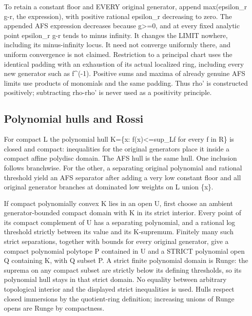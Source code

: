 \documentclass[
  10pt,
]{article}
\begin{document}
To retain a constant floor and EVERY original generator, append
max(epsilon\_r g-r, the expression), with positive rational epsilon\_r
decreasing to zero. The appended AFS expression decreases because
g\textgreater=0, and at every fixed analytic point epsilon\_r g-r tends
to minus infinity. It changes the LIMIT nowhere, including its
minus-infinity locus. It need not converge uniformly there, and uniform
convergence is not claimed. Restriction to a principal chart uses the
identical padding with an exhaustion of its actual localized ring,
including every new generator such as f\^{}(-1). Positive sums and
maxima of already genuine AFS limits use products of monomials and the
same padding. Thus rho' is constructed positively; subtracting rho-rho'
is never used as a positivity principle.

\subsection{Polynomial hulls and
Rossi}\label{polynomial-hulls-and-rossi}

For compact L the polynomial hull K=\{x:
\textbar f(x)\textbar\textless=sup\_L\textbar f\textbar{} for every f in
R\} is closed and compact: inequalities for the original generators
place it inside a compact affine polydisc domain. The AFS hull is the
same hull. One inclusion follows branchwise. For the other, a separating
original polynomial and rational threshold yield an AFS separator after
adding a very low constant floor and all original generator branches at
dominated low weights on L union \{x\}.

If compact polynomially convex K lies in an open U, first choose an
ambient generator-bounded compact domain with K in its strict interior.
Every point of its compact complement of U has a separating polynomial,
and a rational log threshold strictly between its value and its
K-supremum. Finitely many such strict separations, together with bounds
for every original generator, give a compact polynomial polytope P
contained in U and a STRICT polynomial open Q containing K, with Q
subset P. A strict finite polynomial domain is Runge: the suprema on any
compact subset are strictly below its defining thresholds, so its
polynomial hull stays in that strict domain. No equality between
arbitrary topological interior and the displayed strict inequalities is
used. Hulls respect closed immersions by the quotient-ring definition;
increasing unions of Runge opens are Runge by compactness.
\end{document}

